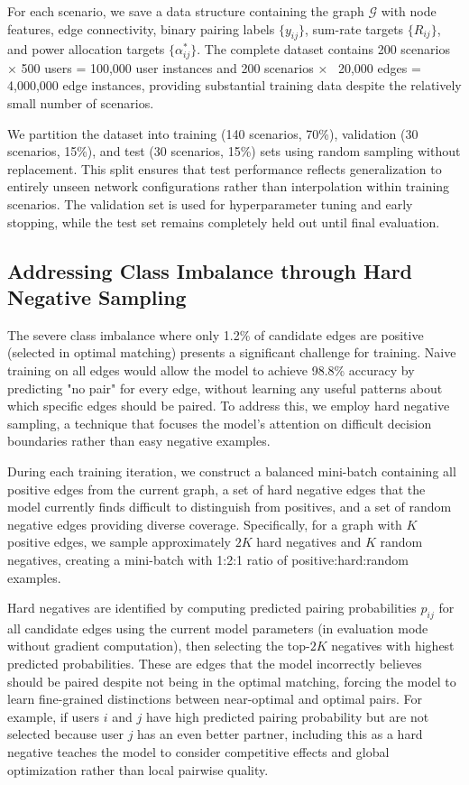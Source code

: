 For each scenario, we save a data structure containing the graph $\mathcal{G}$ with node features, edge connectivity, binary pairing labels $\{y_{ij}\}$, sum-rate targets $\{R_{ij}\}$, and power allocation targets $\{\alpha_{ij}^*\}$. The complete dataset contains 200 scenarios × 500 users = 100,000 user instances and 200 scenarios × ~20,000 edges = 4,000,000 edge instances, providing substantial training data despite the relatively small number of scenarios.

We partition the dataset into training (140 scenarios, 70\%), validation (30 scenarios, 15\%), and test (30 scenarios, 15\%) sets using random sampling without replacement. This split ensures that test performance reflects generalization to entirely unseen network configurations rather than interpolation within training scenarios. The validation set is used for hyperparameter tuning and early stopping, while the test set remains completely held out until final evaluation.

\subsection{Addressing Class Imbalance through Hard Negative Sampling}

The severe class imbalance where only 1.2\% of candidate edges are positive (selected in optimal matching) presents a significant challenge for training. Naive training on all edges would allow the model to achieve 98.8\% accuracy by predicting "no pair" for every edge, without learning any useful patterns about which specific edges should be paired. To address this, we employ hard negative sampling, a technique that focuses the model's attention on difficult decision boundaries rather than easy negative examples.

During each training iteration, we construct a balanced mini-batch containing all positive edges from the current graph, a set of hard negative edges that the model currently finds difficult to distinguish from positives, and a set of random negative edges providing diverse coverage. Specifically, for a graph with $K$ positive edges, we sample approximately $2K$ hard negatives and $K$ random negatives, creating a mini-batch with 1:2:1 ratio of positive:hard:random examples.

Hard negatives are identified by computing predicted pairing probabilities $p_{ij}$ for all candidate edges using the current model parameters (in evaluation mode without gradient computation), then selecting the top-$2K$ negatives with highest predicted probabilities. These are edges that the model incorrectly believes should be paired despite not being in the optimal matching, forcing the model to learn fine-grained distinctions between near-optimal and optimal pairs. For example, if users $i$ and $j$ have high predicted pairing probability but are not selected because user $j$ has an even better partner, including this as a hard negative teaches the model to consider competitive effects and global optimization rather than local pairwise quality.

